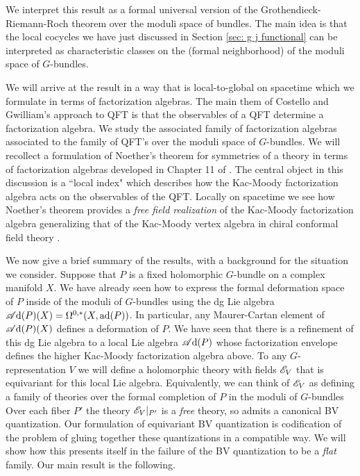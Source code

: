 \documentclass[10pt]{amsart}
\def\sAd{\sA{\rm d}}
\begin{document}
We interpret this result as a formal universal version of the Grothendieck-Riemann-Roch theorem over the moduli space of bundles. 
The main idea is that the local cocycles we have just discussed in Section \ref{sec: g j functional} can be interpreted as characteristic classes on the (formal neighborhood) of the moduli space of $G$-bundles.

We will arrive at the result in a way that is local-to-global on spacetime which we formulate in terms of factorization algebras.
The main them of Costello and Gwilliam's approach to QFT is that the observables of a QFT determine a factorization algebra. 
We study the associated family of factorization algebras associated to the family of QFT's over the moduli space of $G$-bundles.
We will recollect a formulation of Noether's theorem for symmetries of a theory in terms of factorization algebras developed in Chapter 11 of \cite{CG2}. 
The central object in this discussion is a ``local index" which describes how the Kac-Moody factorization algebra acts on the observables of the QFT. 
Locally on spacetime we see how Noether's theorem provides a {\em free field realization} of the Kac-Moody factorization algebra generalizing that of the Kac-Moody vertex algebra in chiral conformal field theory \cite{FrenkelFree}. 

We now give a brief summary of the results, with a background for the situation we consider.
Suppose that $P$ is a fixed holomorphic $G$-bundle on a complex manifold $X$.
We have already seen how to express the formal deformation space of $P$ inside of the moduli of $G$-bundles using the dg Lie algebra $\sAd(P)(X) = \Omega^{0,*}(X , \ad (P))$.
In particular, any Maurer-Cartan element of $\sAd(P)(X)$ defines a deformation of $P$. 
We have seen that there is a refinement of this dg Lie algebra to a local Lie algebra $\sAd(P)$ whose factorization envelope defines the higher Kac-Moody factorization algebra above.
To any $G$-representation $V$ we will define a holomorphic theory with fields $\mathscr E_V$ that is equivariant for this local Lie algebra. 
Equivalently, we can think of $\mathscr E_V$ as defining a family of theories over the formal completion of $P$ in the moduli of $G$-bundles
\ben
{}
\een
Over each fiber $P'$ the theory $\mathscr E_V|_{P'}$ is a {\em free} theory, so admits a canonical BV quantization. 
Our formulation of equivariant BV quantization is codification of the problem of gluing together these quantizations in a compatible way.
We will show how this presents itself in the failure of the BV quantization to be a {\em flat} family. 
Our main result is the following. 
\end{document}
